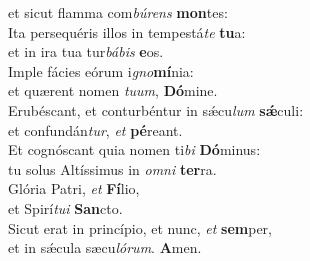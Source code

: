 \oddverse et sicut flamma com\textit{bú}\textit{rens} \textbf{mon}tes:\\
\evenverse Ita persequéris illos in tempestá\textit{te} \textbf{tu}a:~\*\\
\evenverse et in ira tua tur\textit{bá}\textit{bis} \textbf{e}os.\\
\oddverse Imple fácies eórum i\textit{gno}\textbf{mí}nia:~\*\\
\oddverse et quærent nomen \textit{tu}\textit{um}, \textbf{Dó}mine.\\
\evenverse Erubéscant, et conturbéntur in sǽcu\textit{lum} \textbf{sǽ}culi:~\*\\
\evenverse et confundán\textit{tur}, \textit{et} \textbf{pé}reant.\\
\oddverse Et cognóscant quia nomen ti\textit{bi} \textbf{Dó}minus:~\*\\
\oddverse tu solus Altíssimus in \textit{om}\textit{ni} \textbf{ter}ra.\\
\evenverse Glória Patri, \textit{et} \textbf{Fí}lio,~\*\\
\evenverse et Spirí\textit{tu}\textit{i} \textbf{San}cto.\\
\oddverse Sicut erat in princípio, et nunc, \textit{et} \textbf{sem}per,~\*\\
\oddverse et in sǽcula sæcu\textit{ló}\textit{rum}. \textbf{A}men.\\
